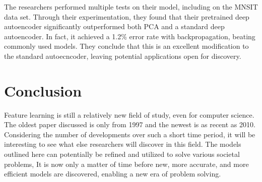 \documentclass{article}
\begin{document}
The researchers performed multiple tests on their model, including on the MNSIT data set. Through their experimentation, they found that their pretrained deep autoencoder significantly outperformed both PCA and a standard deep autoencoder. In fact, it achieved a 1.2\% error rate with backpropagation, beating commonly used models. They conclude that this is an excellent modification to the standard autoecncoder, leaving potential applications open for discovery.

\section{Conclusion}

Feature learning is still a relatively new field of study, even for computer science. The oldest paper discussed is only from 1997 and the newest is as recent as 2010. Considering the number of developments over such a short time period, it will be interesting to see what else researchers will discover in this field. The models outlined here can potentially be refined and utilized to solve various societal problems, It is now only a matter of time before new, more accurate, and more efficient models are discovered, enabling a new era of problem solving.

\newpage

\nocite{*}


\end{document}
